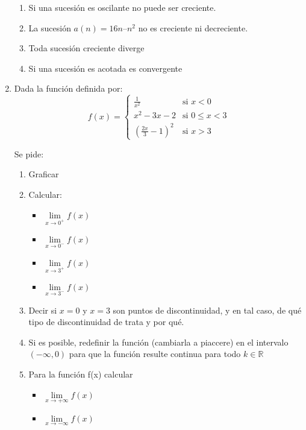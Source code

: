 \documentclass[12pt]{article}
\begin{document}
\begin{enumerate}
\begin{enumerate}
	\item Si una sucesión es oscilante no puede ser creciente.
	\item La sucesión $a(n) = 16n – n^2$ no es creciente ni decreciente.
	\item Toda sucesión creciente diverge
	\item Si una sucesión es acotada es convergente
\end{enumerate}

\item  
Dada la función definida por:
\begin{equation*}
	f(x) = 
	\begin{cases} 
		\frac{1}{x^2}  & \text{si      } x < 0 \\
		x^2-3x-2& \text{si  } 0\leq x < 3\\
		(\frac{2x}{3} - 1)^2  & \text{si     } x > 3
	\end{cases}
\end{equation*}

Se pide:

\begin{enumerate}
	\item Graficar
	\item Calcular:
	\begin{itemize}
		\item  $\lim\limits_{x \to 0^+} f(x) $
		\item  $\lim\limits_{x \to 0^-} f(x) $
		\item  $\lim\limits_{x \to 3^+} f(x) $
		\item  $\lim\limits_{x \to 3^-} f(x) $
	\end{itemize}
	\item Decir si $x = 0$ y $x = 3$ son puntos de discontinuidad, y en tal caso, de qué tipo de discontinuidad de trata y por qué.
	\item Si es posible, redefinir la función (cambiarla a piaccere) en el intervalo $(-\infty, 0)$ para que la función resulte continua para todo  $k \in \mathbb{R}$ 
	\item Para la función f(x) calcular
	\begin{itemize}
		\item  $\lim\limits_{x \to +\infty} f(x) $
		\item  $\lim\limits_{x \to -\infty} f(x) $
		\end{itemize}
	\end{enumerate}
\end{enumerate}
\end{document}
